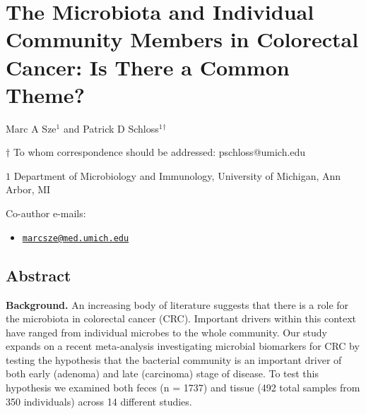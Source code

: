 \documentclass[12pt,]{article}
\title{}
\author{}
\date{}
\providecommand{\tightlist}{%
  \setlength{\itemsep}{0pt}\setlength{\parskip}{0pt}}
\begin{document}
\section{The Microbiota and Individual Community Members in Colorectal
Cancer: Is There a Common
Theme?}\label{the-microbiota-and-individual-community-members-in-colorectal-cancer-is-there-a-common-theme}

\begin{center}
\vspace{25mm}

Marc A Sze${^1}$ and Patrick D Schloss${^1}$${^\dagger}$

\vspace{20mm}

$\dagger$ To whom correspondence should be addressed: pschloss@umich.edu

$1$ Department of Microbiology and Immunology, University of Michigan, Ann Arbor, MI




\end{center}

Co-author e-mails:

\begin{itemize}
\tightlist
\item
  \href{mailto:marcsze@med.umich.edu}{\nolinkurl{marcsze@med.umich.edu}}
\end{itemize}

\newpage

\linenumbers

\subsection{Abstract}\label{abstract}

\textbf{Background.} An increasing body of literature suggests that
there is a role for the microbiota in colorectal cancer (CRC). Important
drivers within this context have ranged from individual microbes to the
whole community. Our study expands on a recent meta-analysis
investigating microbial biomarkers for CRC by testing the hypothesis
that the bacterial community is an important driver of both early
(adenoma) and late (carcinoma) stage of disease. To test this hypothesis
we examined both feces (n = 1737) and tissue (492 total samples from 350
individuals) across 14 different studies.
\end{document}
